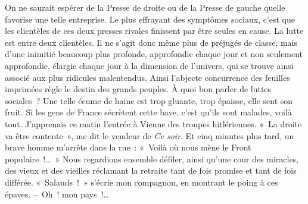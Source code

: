 \documentclass[french,twoside]{book} %
\newcommand{\astertri}{\medskip\par\centerline{\color{rubric}\large\selectfont{\syms ✻\,✻\,✻}}\medskip\par}%
\begin{document}
On ne saurait espérer de la Presse de droite ou de la Presse de gauche quelle favorise une telle entreprise. Le plus effrayant des symptômes sociaux, c’est que les clientèles de ces deux presses rivales finissent par être seules en cause. La lutte est entre deux clientèles. Il ne s’agit donc même plus de préjugés de classe, mais d’une inimitié beaucoup plus profonde, approfondie chaque jour et non seulement approfondie, élargie chaque jour à la dimension de l’univers, qui se trouve ainsi associé aux plus ridicules malentendus. Ainsi l’abjecte concurrence des feuilles imprimées règle le destin des grands peuples. À quoi bon parler de luttes sociales ? Une telle écume de haine est trop gluante, trop épaisse, elle sent son fruit. Si les gens de France sécrètent cette bave, c’est qu’ils sont malades, voilà tout. J’apprenais ce matin l’entrée à Vienne des troupes hitlériennes. « La droite va être contente », me dit le vendeur de \emph{Ce soir}. Et cinq minutes plus tard, un brave homme m’arrête dans la rue : « Voilà où nous mène le Front populaire !… » Nous regardions ensemble défiler, ainsi qu’une cour des miracles, des vieux et des vieilles réclamant la retraite tant de fois promise et tant de fois différée. « Salauds ! » s’écrie mon compagnon, en montrant le poing à ces épaves. – Oh ! mon pays !…\par
 \par

\astertri
\end{document}
